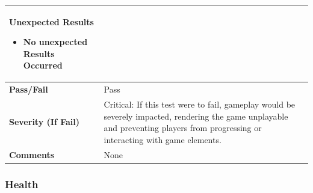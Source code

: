 \documentclass[11pt, a4paper]{article}
\begin{document}
\begin{center}
\begin{tabularx}{\linewidth}{|>{\raggedright\arraybackslash}m{4cm}|X|}
\begin{itemize}
    \end{itemize}
    \textbf{Unexpected Results}
    \begin{itemize}
        \item No unexpected Results Occurred
    \end{itemize}
    \\
    \hline
    \textbf{Pass/Fail} & Pass \\
    \hline
    \textbf{Severity (If Fail)} & Critical: If this test were to fail, gameplay would be severely impacted, rendering the game unplayable and preventing players from progressing or interacting with game elements. \\
    \hline
    \textbf{Comments} & None \\
    \hline
\end{tabularx}
\end{center}

\subsubsection{Health}
\end{document}
